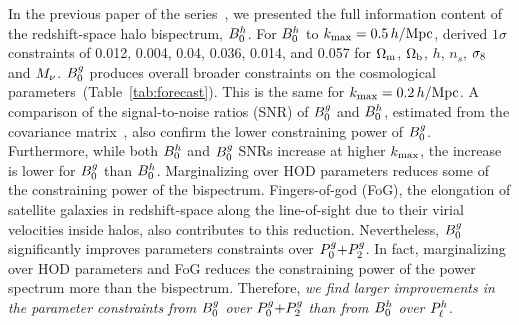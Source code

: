 

In the previous paper of the series~\citep{hahn2020}, we presented the full
information content of the redshift-space halo bispectrum, $B^h_0$. For $B^h_0$ to
$k_{\rm max}=0.5\,h/\mathrm{Mpc}$, \cite{hahn2020} derived $1\sigma$ constraints of 
0.012, 0.004, 0.04, 0.036, 0.014, and 0.057 
for $\Omega_{\rm m}$, $\Omega_{\rm b}$, $h$, $n_s$, $\sigma_8$ and $M_\nu$. 
$B^g_0$ produces overall broader constraints on the cosmological parameters~(Table~\ref{tab:forecast}). This
is the same for $k_{\rm max}=0.2\,h/\mathrm{Mpc}$. A comparison of the signal-to-noise ratios
(SNR) of $B^g_0$ and $B^h_0$, estimated from the covariance
matrix~\citep[\eg][]{sefusatti2005,sefusatti2006,chan2017}, also confirm the lower
constraining power of $B^g_0$. Furthermore, while both $B^h_0$ and $B^g_0$ SNRs increase 
at higher $k_{\rm max}$, the increase is lower for $B^g_0$ than $B^h_0$.
Marginalizing over HOD parameters reduces some of the constraining power of 
the bispectrum. Fingers-of-god (FoG), the elongation of satellite galaxies
in redshift-space along the line-of-sight due to their virial velocities inside 
halos, also contributes to this reduction. 
Nevertheless, $B^g_0$ significantly improves parameters constraints over $P^g_0{+}P^g_2$.
In fact, marginalizing over HOD parameters and FoG reduces the constraining
power of the power spectrum more than the bispectrum. Therefore, {\em we find 
larger improvements in the parameter constraints from $B^g_0$ over $P^g_0{+}P^g_2$ than
from $B^h_0$ over $P^h_{\ell}$}.

